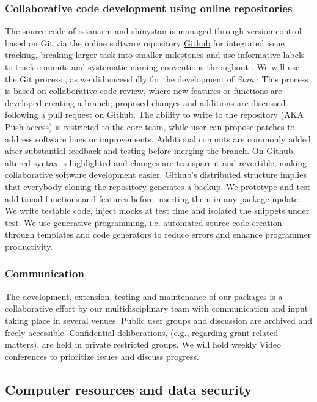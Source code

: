 \documentclass[11pt,notitlepage]{article}
\begin{document}
\subsubsection*{Collaborative code development using online repositories }
The source code of rstanarm and shinystan is managed through version control based on Git \cite{Chacon2009ProGit} via the online software repository \href{https://github.com/}{Github} for integrated issue tracking, breaking larger task into smaller milestones and use informative labels to track commits and systematic naming conventions throughout \cite{loeliger2012version}. We will use the Git process \cite{Driessen2010successful}, as we did sucessfully for the development of \textit{Stan} \cite{Stan-manual:2015}: This  process is based on collaborative code review, where new features or functions are developed creating a branch; proposed changes and additions are discussed following a pull request on Github. The ability to write to the repository (AKA Push access) is restricted to the core team, while user can propose patches to address software bugs or improvements. Additional commits are commonly added after substantial feedback and testing before merging the branch.  On Github, altered syntax is highlighted and changes are transparent and revertible, making collaborative software development easier. Github's distributed structure implies that everybody cloning the repository generates a backup. We prototype and test additional functions and features before inserting them in any package update. We write testable code, inject mocks at test time and isolated the snippets under test. We use generative programming, i.e. automated source code creation through templates and code generators to reduce errors and enhance programmer productivity. 

\subsubsection*{Communication}
The development, extension, testing and maintenance of our packages is a collaborative effort by our multidisciplinary team with communication and input taking place in several venues. Public user groups and discussion are archived and freely accessible. Confidential deliberations, (e.g., regarding grant related matters), are held in private restricted groups. We will hold weekly Video conferences to prioritize issues and discuss progress.

\subsection*{Computer resources and data security}
\end{document}
